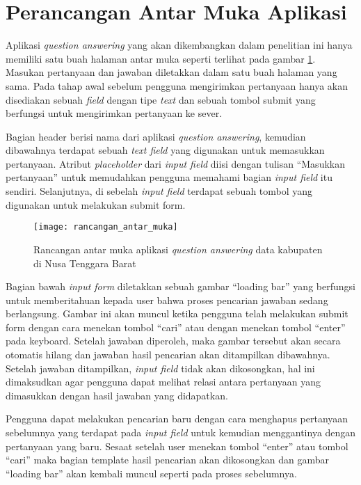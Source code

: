 \section{Perancangan Antar Muka Aplikasi}
Aplikasi \emph{question answering} yang akan dikembangkan dalam penelitian ini hanya memiliki satu buah halaman antar muka seperti terlihat pada gambar \ref{fig:rancangan_antarmuka}. Masukan pertanyaan dan jawaban diletakkan dalam satu buah halaman yang sama. Pada tahap awal sebelum pengguna mengirimkan pertanyaan hanya akan disediakan sebuah \emph{field} dengan tipe \emph{text} dan sebuah tombol submit yang berfungsi untuk mengirimkan pertanyaan ke sever.

Bagian header berisi nama dari aplikasi \emph{question answering}, kemudian dibawahnya terdapat sebuah \emph{text field} yang digunakan untuk memasukkan pertanyaan. Atribut \emph{placeholder} dari \emph{input field} diisi dengan tulisan ``Masukkan pertanyaan'' untuk memudahkan pengguna memahami bagian \emph{input field} itu sendiri. Selanjutnya, di sebelah \emph{input field} terdapat sebuah tombol yang digunakan untuk melakukan submit form.

\begin{figure}[ht]
    \centering
    \texttt{[image: rancangan\_antar\_muka]}
    \caption{Rancangan antar muka aplikasi \emph{question answering} data kabupaten di Nusa Tenggara Barat}
    \label{fig:rancangan_antarmuka}
\end{figure}

Bagian bawah \emph{input form} diletakkan sebuah gambar ``loading bar'' yang berfungsi untuk memberitahuan kepada user bahwa proses pencarian jawaban sedang berlangsung. Gambar ini akan muncul ketika pengguna telah melakukan submit form dengan cara menekan tombol ``cari'' atau dengan menekan tombol ``enter'' pada keyboard. Setelah jawaban diperoleh, maka gambar tersebut akan secara otomatis hilang dan jawaban hasil pencarian akan ditampilkan dibawahnya. Setelah jawaban ditampilkan, \emph{input field} tidak akan dikosongkan, hal ini dimaksudkan agar pengguna dapat melihat relasi antara pertanyaan yang dimasukkan dengan hasil jawaban yang didapatkan.

Pengguna dapat melakukan pencarian baru dengan cara menghapus pertanyaan sebelumnya yang terdapat pada \emph{input field} untuk kemudian menggantinya dengan pertanyaan yang baru. Sesaat setelah user menekan tombol ``enter'' atau tombol ``cari'' maka bagian template hasil pencarian akan dikosongkan dan gambar ``loading bar'' akan kembali muncul seperti pada proses sebelumnya.